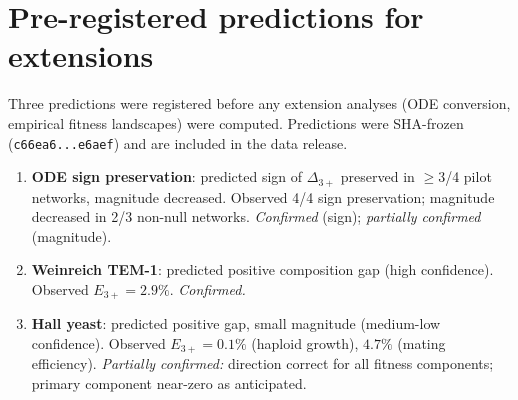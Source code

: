 \documentclass[10pt]{article}
\begin{document}
\appendix
\section{Pre-registered predictions for extensions}
\label{app:prereg}

Three predictions were registered before any extension analyses
(ODE conversion, empirical fitness landscapes) were computed.
Predictions were SHA-frozen
(\texttt{c66ea6...e6aef}) and are included in the data release.

\begin{enumerate}
\item \textbf{ODE sign preservation}: predicted sign of
  $\Delta_{3+}$ preserved in $\geq$3/4 pilot networks, magnitude
  decreased. Observed 4/4 sign preservation; magnitude decreased
  in 2/3 non-null networks. \emph{Confirmed} (sign);
  \emph{partially confirmed} (magnitude).

\item \textbf{Weinreich TEM-1}: predicted positive composition
  gap (high confidence). Observed $E_{3+} = 2.9\%$.
  \emph{Confirmed.}

\item \textbf{Hall yeast}: predicted positive gap, small magnitude
  (medium-low confidence). Observed $E_{3+} = 0.1\%$ (haploid
  growth), $4.7\%$ (mating efficiency). \emph{Partially confirmed:}
  direction correct for all fitness components; primary component
  near-zero as anticipated.
\end{enumerate}





\end{document}
